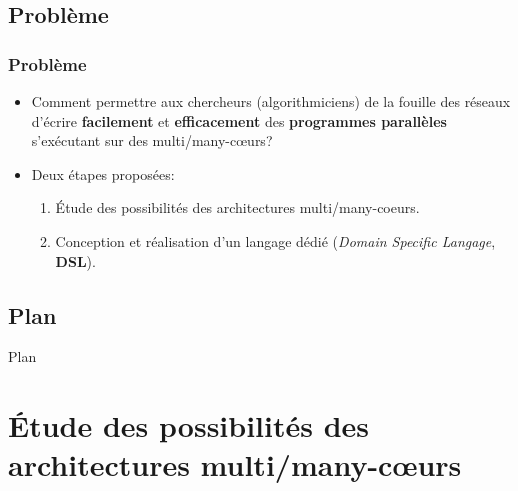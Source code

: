 \documentclass[10pt]{beamer}
\begin{document}
\subsection{Problème}
\begin{frame}
\frametitle{Problème}
\begin{itemize}
 \item Comment permettre aux chercheurs (algorithmiciens) de la fouille des réseaux d'écrire \textbf{facilement} et \textbf{efficacement} des \textbf{programmes parallèles} s'exécutant sur des multi/many-c\oe urs?
 \item Deux étapes proposées:
    \begin{enumerate}
      \item Étude des possibilités des architectures multi/many-coeurs.
      \item Conception et réalisation d'un langage dédié (\textit{Domain Specific Langage}, \textbf{DSL}).
    \end{enumerate}
\end{itemize}
\end{frame}
\subsection{Plan}
\begin{frame}{Plan}
    \tableofcontents[sections={2-8},hideothersubsections]
\end{frame}
\section{Étude des possibilités des architectures multi/many-c\oe urs}
\end{document}
